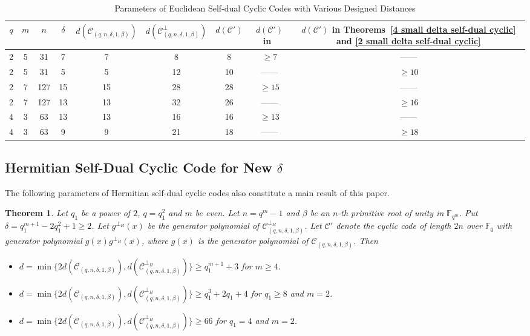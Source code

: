 \documentclass[journal,12pt,onecolumn]{IEEEtran}
\newtheorem{theorem}{Theorem}
\begin{document}
\begin{table}[H]
  \centering
  \small
  \caption{Parameters of Euclidean Self-dual Cyclic Codes with Various Designed Distances}
  \label{design distance}
  \begin{tabular}{|c|c|c|c|c|c|c|c|c|}
    \hline
    $q$ & $m$ & $n$ & $\delta$ & $d(\mathcal{C}_{(q,n,\delta,1,\beta)})$ & $d(\mathcal{C}_{(q,n,\delta,1,\beta)}^\perp)$ & $d(\mathcal{C}')$ & $d(\mathcal{C}')$ in~\cite{10856234} & $d(\mathcal{C}')$ in Theorems~\ref{4 small delta self-dual cyclic} and \ref{2 small delta self-dual cyclic} \\
    \hline
    2 & 5 & 31 & 7 & 7 & 8 & 8 & $\ge 7$ & —— \\
    \hline
    2 & 5 & 31 & 5 & 5 & 12 & 10 & —— & $\ge 10$ \\
    \hline
    2 & 7 & 127 & 15 & 15 & 28 & 28 & $\ge 15$ & —— \\
    \hline
    2 & 7 & 127 & 13 & 13 & 32 & 26 & —— & $\ge 16$ \\
    \hline
    4 & 3 & 63 & 13 & 13 & 16 & 16 & $\ge 13$ & —— \\
    \hline
    4 & 3 & 63 & 9 & 9 & 21 & 18 & —— & $\ge 18$ \\
    \hline
  \end{tabular}
\end{table}

\subsection{Hermitian Self-Dual Cyclic Code for New $\delta$}

The following parameters of Hermitian self-dual cyclic codes also constitute a main result of this paper.

\begin{theorem}
	\label{even Hermitian low delta}
	Let $q_1$ be a power of $2$, $q=q_1^2$ and $m$ be even. Let $n=q^m-1$ and $\beta$ be an $n$-th primitive root of unity in $\mathbb{F}_{q^m}$. Put $\delta=q_1^{m+1}-2q_1^2+1\ge 2$. Let $g^{\perp_H}(x)$ be the generator polynomial of $\mathcal{C}_{(q,n,\delta,1,\beta)}^{\perp_H}$. Let $\mathcal{C}'$ denote the cyclic code of length $2n$ over $\mathbb{F}_q$ with generator polynomial $g(x)g^{\perp_H}(x)$, where $g(x)$ is the generator polynomial of $\mathcal{C}_{(q,n,\delta,1,\beta)}$. Then
	\begin{itemize}
		\item $d=\min\{2d(\mathcal{C}_{(q,n,\delta,1,\beta)}),d(\mathcal{C}_{(q,n,\delta,1,\beta)}^{\perp_H})\}\ge q_1^{m+1}+3$ for $m\ge4$.
		\item $d=\min\{2d(\mathcal{C}_{(q,n,\delta,1,\beta)}),d(\mathcal{C}_{(q,n,\delta,1,\beta)}^{\perp_H})\}\ge q_1^3+2q_1+4$ for $q_1\ge8$ and $m=2$.
		\item $d=\min\{2d(\mathcal{C}_{(q,n,\delta,1,\beta)}),d(\mathcal{C}_{(q,n,\delta,1,\beta)}^{\perp_H})\}\ge66$ for $q_1=4$ and $m=2$.
	\end{itemize}
\end{theorem}
\end{document}
